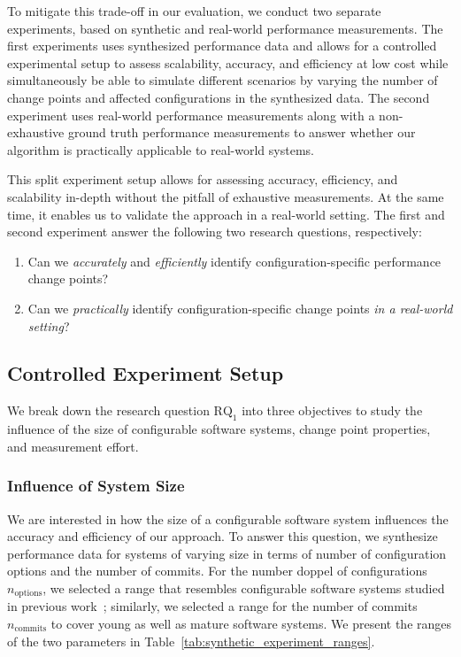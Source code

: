 \documentclass[sigconf]{acmart}
\begin{document}
	To mitigate this trade-off in our evaluation, we conduct two separate experiments, based on synthetic and real-world performance measurements. The first experiments uses synthesized performance data and allows for a controlled experimental setup to assess scalability, accuracy, and efficiency at low cost while simultaneously be able to simulate different scenarios by varying the number of change points and affected configurations in the synthesized data.
	The second experiment uses real-world performance measurements along with a non-exhaustive ground truth performance measurements to answer whether our algorithm is practically applicable to real-world systems.
	
	This split experiment setup allows for assessing accuracy, efficiency, and scalability in-depth without the pitfall of exhaustive measurements. At the same time, it enables us to validate the approach in a real-world setting. The first and second experiment answer the following two research questions, respectively:
	\begin{enumerate}[$\text{RQ}_1$)]
		\item Can we \emph{accurately} and \emph{efficiently} identify configuration-specific performance change points? 
		\item Can we \emph{practically} identify configuration-specific change points \emph{in a real-world setting}? 
	\end{enumerate}

	\subsection{Controlled Experiment Setup}
    We break down the research question $\text{RQ}_1$ into three objectives  to study the influence of the size of configurable software systems, change point properties, and measurement effort.
	
	\subsubsection{Influence of System Size}
	We are interested in how the size of a configurable software system influences the accuracy and efficiency of our approach. 
	To answer this question, we synthesize performance data for systems of varying size in terms of number of configuration options and the number of commits. For the number doppel of configurations $n_\text{options}$, we selected a range that resembles configurable software systems studied in previous work~\cite{muhlbauer_accurate_2019}; similarly, we selected a range for the number of commits $n_\text{commits}$ to cover young as well as mature software systems. We present the ranges of the two parameters in Table~\ref{tab:synthetic_experiment_ranges}.
	
\end{document}
